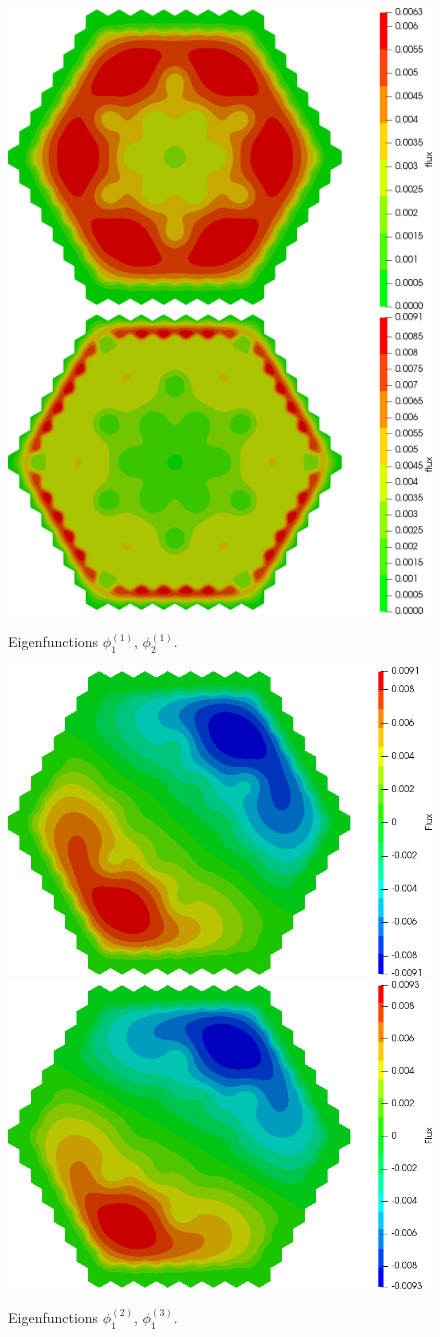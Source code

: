 \documentclass[authoryear]{elsarticle}
\begin{document}
\begin{figure}[h]
\begin{center}
	\includegraphics[width=0.49\linewidth]{iaea_with/alpha_delayed_sp3_u1_1.png}
	\includegraphics[width=0.49\linewidth]{iaea_with/alpha_delayed_sp3_u2_1.png}\\
	\caption{Eigenfunctions $\phi_1^{(1)}$, $\phi_2^{(1)}$.}
	\label{fig:iaea_with_fun_del_1}
\end{center}
\end{figure}

\begin{figure}[h]
\begin{center}
	\includegraphics[width=0.49\linewidth]{iaea_with/alpha_delayed_sp3_u1_2.png}
	\includegraphics[width=0.49\linewidth]{iaea_with/alpha_delayed_sp3_u1_3.png}\\
	\caption{Eigenfunctions $\phi_1^{(2)}$, $\phi_1^{(3)}$.}
	\label{fig:iaea_with_fun_del_2}
\end{center}
\end{figure}
\end{document}
